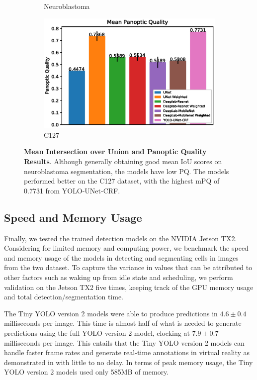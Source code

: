 \documentclass[10pt, journal, compsoc]{IEEEtran}
\begin{document}
\begin{figure}
\begin{subfigure}[b]{0.49\linewidth}
\caption*{Neuroblastoma}
\end{subfigure}
\begin{subfigure}[b]{0.49\linewidth}
\includegraphics[width=\linewidth]{graphs/Mean-Panoptic-Quality-(C127).eps}
\caption*{C127}
\end{subfigure}
\caption{\textbf{Mean Intersection over Union and Panoptic Quality Results}. Although generally obtaining good mean IoU scores on neuroblastoma segmentation, the models have low PQ. The models performed better on the C127 dataset, with the highest mPQ of 0.7731 from YOLO-UNet-CRF.}
\label{fig:graph_results}
\end{figure}
\subsection{Speed and Memory Usage}
Finally, we tested the trained detection models on the NVIDIA Jetson TX2. Considering for limited memory and computing power, we benchmark the speed and memory usage of the models in detecting and segmenting cells in images from the two dataset. To capture the variance in values that can be attributed to other factors such as waking up from idle state and scheduling, we perform validation on the Jetson TX2 five times, keeping track of the GPU memory usage and total detection/segmentation time.

The Tiny YOLO version 2 models were able to produce predictions in $4.6\pm0.4$ milliseconds per image. This time is almost half of what is needed to generate predictions using the full YOLO version 2 model, clocking at $7.9\pm0.7$ milliseconds per image. This entails that the Tiny YOLO version 2 models can handle faster frame rates and generate real-time annotations in virtual reality as demonstrated in \cite{Waithe544833} with little to no delay. In terms of peak memory usage, the Tiny YOLO version 2 models used only 585MB of memory.
\end{document}
